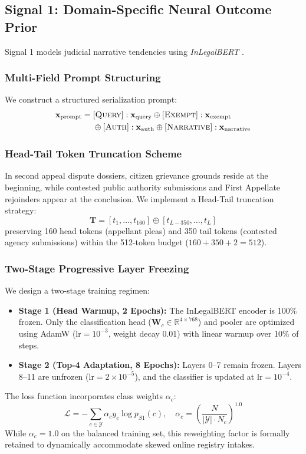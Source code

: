 \documentclass[conference]{IEEEtran}
\begin{document}
\subsection{Signal 1: Domain-Specific Neural Outcome Prior}
Signal 1 models judicial narrative tendencies using \textit{InLegalBERT} \cite{paul2023pre}.

\subsubsection{Multi-Field Prompt Structuring}
We construct a structured serialization prompt:
\begin{align}
\mathbf{x}_{\text{prompt}} = &\; [\textsc{Query}]: \mathbf{x}_{\text{query}} \oplus [\textsc{Exempt}]: \mathbf{x}_{\text{exempt}} \nonumber\\
&\; \oplus [\textsc{Auth}]: \mathbf{x}_{\text{auth}} \oplus [\textsc{Narrative}]: \mathbf{x}_{\text{narrative}}
\end{align}

\subsubsection{Head-Tail Token Truncation Scheme}
In second appeal dispute dossiers, citizen grievance grounds reside at the beginning, while contested public authority submissions and First Appellate rejoinders appear at the conclusion. We implement a Head-Tail truncation strategy:
\begin{equation}
\mathbf{T} = [t_1, \dots, t_{160}] \oplus [t_{L-350}, \dots, t_L]
\end{equation}
preserving 160 head tokens (appellant pleas) and 350 tail tokens (contested agency submissions) within the 512-token budget ($160 + 350 + 2 = 512$).

\subsubsection{Two-Stage Progressive Layer Freezing}
We design a two-stage training regimen:
\begin{itemize}
    \setlength{\itemsep}{1pt}\setlength{\parskip}{0pt}\setlength{\parsep}{0pt}
    \item \textbf{Stage 1 (Head Warmup, 2 Epochs):} The InLegalBERT encoder is 100\% frozen. Only the classification head ($\mathbf{W}_c \in \mathbb{R}^{4 \times 768}$) and pooler are optimized using AdamW ($\text{lr}=10^{-3}$, weight decay 0.01) with linear warmup over 10\% of steps.
    \item \textbf{Stage 2 (Top-4 Adaptation, 8 Epochs):} Layers 0--7 remain frozen. Layers 8--11 are unfrozen ($\text{lr}=2 \times 10^{-5}$), and the classifier is updated at $\text{lr}=10^{-4}$.
\end{itemize}
The loss function incorporates class weights $\alpha_c$:
\begin{equation}
\mathcal{L} = -\sum_{c \in \mathcal{Y}} \alpha_c y_c \log p_{S1}(c), \quad \alpha_c = \left(\frac{N}{|\mathcal{Y}| \cdot N_c}\right)^{1.0}
\end{equation}
While $\alpha_c = 1.0$ on the balanced training set, this reweighting factor is formally retained to dynamically accommodate skewed online registry intakes.
\end{document}
